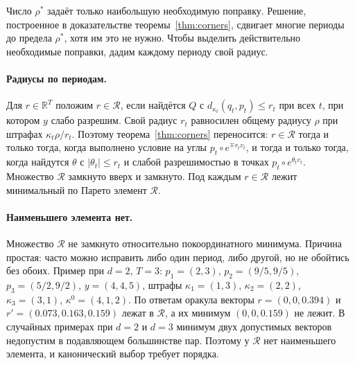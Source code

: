 \documentclass[a4paper,11pt]{article}
\theoremstyle{plain}
\theoremstyle{definition}
\theoremstyle{remark}
\newcommand{\R}{\mathbb{R}}
\newcommand{\abs}[1]{\left\lvert #1 \right\rvert}
\begin{document}
Число $\rho^*$ задаёт только наибольшую необходимую поправку. Решение, построенное в доказательстве теоремы~\ref{thm:corners}, сдвигает многие периоды до предела $\rho^*$, хотя им это не нужно. Чтобы выделить действительно необходимые поправки, дадим каждому периоду свой радиус.

\paragraph{Радиусы по периодам.} Для $r\in\R^T$ положим $r\in\mathcal R$, если найдётся $Q$ с $d_{\kappa_t}(q_t,p_t)\le r_t$ при всех $t$, при котором $y$ слабо разрешим. Свой радиус $r_t$ равносилен общему радиусу $\rho$ при штрафах $\kappa_t\rho/r_t$. Поэтому теорема~\ref{thm:corners} переносится: $r\in\mathcal R$ тогда и только тогда, когда выполнено условие на углы $p_t\circ e^{\mp r_tv_t}$, и тогда и только тогда, когда найдутся $\theta$ с $\abs{\theta_t}\le r_t$ и слабой разрешимостью в точках $p_t\circ e^{\theta_tv_t}$. Множество $\mathcal R$ замкнуто вверх и замкнуто. Под каждым $r\in\mathcal R$ лежит минимальный по Парето элемент $\mathcal R$.

\paragraph{Наименьшего элемента нет.} Множество $\mathcal R$ не замкнуто относительно покоординатного минимума. Причина простая: часто можно исправить либо один период, либо другой, но не обойтись без обоих. Пример при $d=2$, $T=3$: $p_1=(2,3)$, $p_2=(9/5,9/5)$, $p_3=(5/2,9/2)$, $y=(4,4,5)$, штрафы $\kappa_1=(1,3)$, $\kappa_2=(2,2)$, $\kappa_3=(3,1)$, $\kappa^0=(4,1,2)$. По ответам оракула векторы $r=(0,0,0.394)$ и $r'=(0.073,0.163,0.159)$ лежат в $\mathcal R$, а их минимум $(0,0,0.159)$ не лежит. В случайных примерах при $d=2$ и $d=3$ минимум двух допустимых векторов недопустим в подавляющем большинстве пар. Поэтому у $\mathcal R$ нет наименьшего элемента, и канонический выбор требует порядка.
\end{document}
